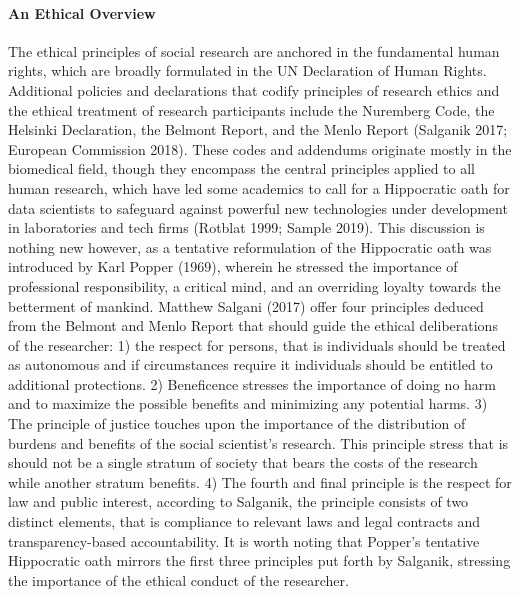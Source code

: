 \documentclass[10pt,a4paper]{report}
\begin{document}
\paragraph{An Ethical Overview \newline}
The ethical principles of social research are anchored in the fundamental human rights, which are broadly formulated in the UN Declaration of Human Rights. Additional policies and declarations that codify principles of research ethics and the ethical treatment of research participants include the Nuremberg Code, the Helsinki Declaration, the Belmont Report, and the Menlo Report (Salganik 2017; European Commission 2018). These codes and addendums originate mostly in the biomedical field, though they encompass the central principles applied to all human research, which have led some academics to call for a Hippocratic oath for data scientists to safeguard against powerful new technologies under development in laboratories and tech firms (Rotblat 1999; Sample 2019). This discussion is nothing new however, as a tentative reformulation of the Hippocratic oath was introduced by Karl Popper (1969), wherein he stressed the importance of professional responsibility, a critical mind, and an overriding loyalty towards the betterment of mankind.\newline
Matthew Salgani (2017) offer four principles deduced from the Belmont and Menlo Report that should guide the ethical deliberations of the researcher: 1) the respect for persons, that is individuals should be treated as autonomous and if circumstances require it individuals should be entitled to additional protections. 2) Beneficence stresses the importance of doing no harm and to maximize the possible benefits and minimizing any potential harms. 3) The principle of justice touches upon the importance of the distribution of burdens and benefits of the social scientist's research. This principle stress that is should not be a single stratum of society that bears the costs of the research while another stratum benefits. 4) The fourth and final principle is the respect for law and public interest, according to Salganik, the principle consists of two distinct elements, that is compliance to relevant laws and legal contracts and transparency-based accountability. It is worth noting that Popper’s tentative Hippocratic oath mirrors the first three principles put forth by Salganik, stressing the importance of the ethical conduct of the researcher.\newline
\end{document}
